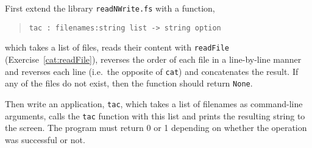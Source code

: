 First extend the library \lstinline{readNWrite.fs} with a function,
\begin{quote}
  \mbox{\lstinline!tac : filenames:string list -> string option!}
\end{quote}
which takes a list of files, reads their content with \lstinline{readFile} (Exercise~\ref{cat:readFile}), reverses the order of each file in a line-by-line manner and reverses each line (i.e.\ the opposite of \lstinline{cat}) and concatenates the result.  If any of the files do not exist, then the function should return \lstinline{None}.

Then write an application, \lstinline[language=console]{tac}, which takes a list of filenames as command-line arguments, calls the \lstinline{tac} function with this list and prints the resulting string to the screen. The program must return 0 or 1 depending on whether the operation was successful or not.
